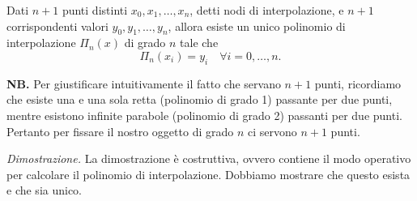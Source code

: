 \begin{theorem}
Dati $n+1$ punti distinti $x_{0} ,x_{1} ,\dotsc ,x_{n}$, detti nodi di interpolazione, e $n+1$ corrispondenti valori $y_{0} ,y_{1} ,\dotsc ,y_{n}$, allora esiste un unico polinomio di interpolazione $\Pi _{n}(x)$ di grado $n$ tale che
\begin{equation}
\Pi _{n}( x_{i}) =y_{i} \quad \forall i=0,\dotsc ,n.
\label{eq:condizione-pol-interpolazione}
\end{equation}
\end{theorem}
\textbf{NB.}
Per giustificare intuitivamente il fatto che servano $n+1$ punti, ricordiamo che esiste una e una sola retta (polinomio di grado 1) passante per due punti, mentre esistono infinite parabole (polinomio di grado 2) passanti per due punti. Pertanto per fissare il nostro oggetto di grado $n$ ci servono $n+1$ punti.

\textit{Dimostrazione.} La dimostrazione è costruttiva, ovvero contiene il modo operativo per calcolare il polinomio di interpolazione. Dobbiamo mostrare che questo esista e che sia unico.

